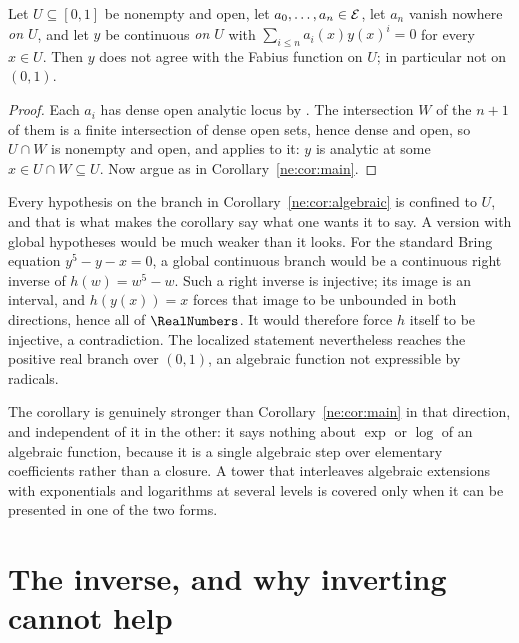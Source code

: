 \begin{corollary}\label{ne:cor:algebraic}
Let $U\subseteq[0,1]$ be nonempty and open, let $a_0,\dots,a_n\in\mathcal E$,
let $a_n$ vanish nowhere \emph{on $U$}, and let $y$ be continuous \emph{on
$U$} with $\sum_{i\le n}a_i(x)y(x)^i=0$ for every $x\in U$.  Then $y$ does not
agree with the Fabius function on $U$; in particular not on $(0,1)$.
\end{corollary}

\begin{proof}
Each $a_i$ has dense open analytic locus by .  The
intersection $W$ of the $n+1$ of them is a finite intersection of dense open
sets, hence dense and open, so $U\cap W$ is nonempty and open, and
 applies to it: $y$ is analytic at some $x\in U\cap
W\subseteq U$.  Now argue as in Corollary~\ref{ne:cor:main}.
\end{proof}

\begin{boxedremark}
Every hypothesis on the branch in Corollary~\ref{ne:cor:algebraic} is confined to
$U$, and that is what makes the corollary say what one wants it to say.  A
version with global hypotheses would be much weaker than it looks.  For the
standard Bring equation $y^5-y-x=0$, a global continuous branch would be a
continuous right inverse of $h(w)=w^5-w$.  Such a right inverse is injective;
its image is an interval, and $h(y(x))=x$ forces that image to be unbounded in
both directions, hence all of $\RealNumbers$.  It would therefore force $h$ itself to be
injective, a contradiction.  The localized statement nevertheless reaches
the positive real branch over $(0,1)$, an algebraic function not expressible by
radicals.

The corollary is genuinely stronger than Corollary~\ref{ne:cor:main} in that
direction, and independent of it in the other: it says nothing about $\exp$ or
$\log$ of an algebraic function, because it is a single algebraic step over
elementary coefficients rather than a closure.  A tower that interleaves
algebraic extensions with exponentials and logarithms at several levels is
covered only when it can be presented in one of the two forms.
\end{boxedremark}

\section{The inverse, and why inverting cannot help}\label{ne:sec:inverse}

